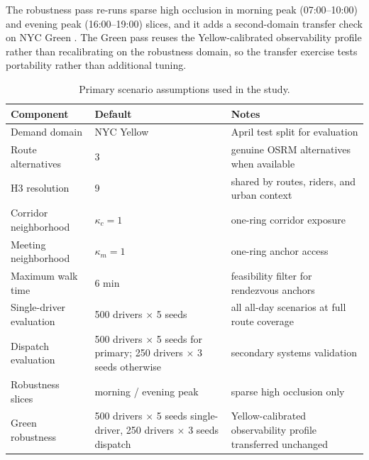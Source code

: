 \documentclass[journal]{IEEEtran}
\begin{document}
The robustness pass re-runs sparse high occlusion in morning peak (07:00--10:00) and evening peak (16:00--19:00) slices, and it adds a second-domain transfer check on NYC Green \cite{azuregreen}. The Green pass reuses the Yellow-calibrated observability profile rather than recalibrating on the robustness domain, so the transfer exercise tests portability rather than additional tuning.

\begin{table}[!t]
\caption{Primary scenario assumptions used in the study.}
\label{tab:assumptions}
\centering
\footnotesize
\begin{tabularx}{\columnwidth}{|L{0.32\columnwidth}|L{0.22\columnwidth}|Y|}
\hline
{}\textbf{Component} & \textbf{Default} & \textbf{Notes} \\
\hline
Demand domain & NYC Yellow & April test split for evaluation \\
\hline
Route alternatives & 3 & genuine OSRM alternatives when available \\
\hline
H3 resolution & 9 & shared by routes, riders, and urban context \\
\hline
Corridor neighborhood & $\kappa_c=1$ & one-ring corridor exposure \\
\hline
Meeting neighborhood & $\kappa_m=1$ & one-ring anchor access \\
\hline
Maximum walk time & 6 min & feasibility filter for rendezvous anchors \\
\hline
Single-driver evaluation & 500 drivers $\times$ 5 seeds & all all-day scenarios at full route coverage \\
\hline
Dispatch evaluation & 500 drivers $\times$ 5 seeds for primary; 250 drivers $\times$ 3 seeds otherwise & secondary systems validation \\
\hline
Robustness slices & morning / evening peak & sparse high occlusion only \\
\hline
Green robustness & 500 drivers $\times$ 5 seeds single-driver, 250 drivers $\times$ 3 seeds dispatch & Yellow-calibrated observability profile transferred unchanged \\
\hline
\end{tabularx}
\end{table}
\end{document}
